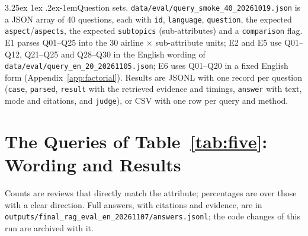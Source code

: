 \documentclass[10pt,twocolumn,a4paper]{article}
\makeatletter
\renewcommand\paragraph{\@startsection{paragraph}{4}{\parindent}%
  {3.25ex \@plus 1ex \@minus .2ex}{-1em}{\normalfont\normalsize\bfseries}}
\makeatother
\begin{document}
\paragraph{Question sets.} \nolinkurl{data/eval/query_smoke_40_20261019.json} is a JSON array of 40 questions, each
with \texttt{id}, \texttt{language}, \texttt{question}, the expected \texttt{aspect}/\texttt{aspects}, the expected
\texttt{subtopics} (sub-attributes) and a \texttt{comparison} flag. E1 parses Q01--Q25 into the 30 airline $\times$
sub-attribute units; E2 and E5 use Q01--Q12, Q21--Q25 and Q28--Q30 in the English wording of \nolinkurl{data/eval/query_en_20_20261105.json}; E6 uses Q01--Q20 in a fixed English form (Appendix~\ref{app:factorial}). Results are JSONL with one record per question
(\texttt{case}, \texttt{parsed}, \texttt{result} with the retrieved evidence and timings, \texttt{answer} with text,
mode and citations, and \texttt{judge}), or CSV with one row per query and method.

\section{The Queries of Table~\ref{tab:five}: Wording and Results}
\label{app:queries}

Counts are reviews that directly match the attribute; percentages are over those with a clear direction. Full answers,
with citations and evidence, are in \nolinkurl{outputs/final_rag_eval_en_20261107/answers.jsonl}; the code changes of this run are archived with it.
\end{document}
